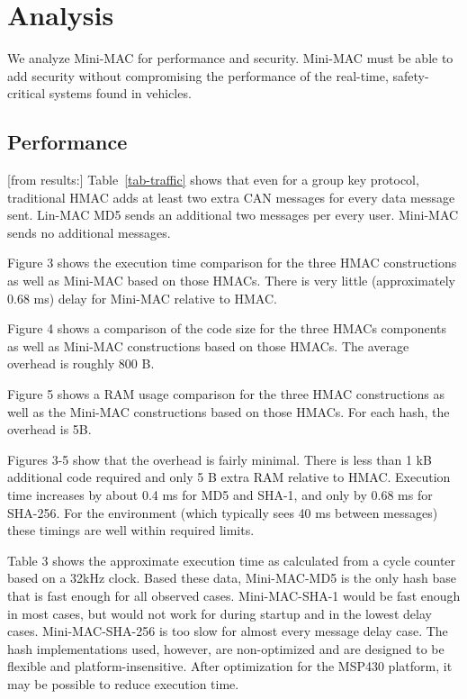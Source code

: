 \section{Analysis}
\label{analysis}



We analyze Mini-MAC for performance and security. Mini-MAC must be able to add security without compromising the performance of the real-time, safety-critical systems found in vehicles.

\subsection{Performance}
\label{performance}

[from results:]
Table~\ref{tab-traffic} shows that even for a group key protocol, 
traditional HMAC adds at least two extra CAN messages for every data message sent. 
Lin-MAC MD5 sends an additional two messages per every user. 
Mini-MAC sends no additional messages. 

Figure 3 shows the execution time comparison for the three HMAC constructions as well as Mini-MAC based on those HMACs. There is very little (approximately 0.68 ms) delay for Mini-MAC relative to HMAC.

Figure 4 shows a comparison of the code size for the three HMACs components as well as Mini-MAC constructions based on those HMACs. The average overhead is roughly 800 B.

Figure 5 shows a RAM usage comparison for the three HMAC constructions as well as the Mini-MAC constructions based on those HMACs. For each hash, the overhead is 5B.

Figures 3-5 show that the overhead is fairly minimal. There is less than 1 kB additional code required and only 5 B extra RAM relative to HMAC. Execution time increases by about 0.4 ms for MD5 and SHA-1, and only by 0.68 ms for SHA-256. For the environment (which typically sees 40 ms between messages) these timings are well within required limits.

Table 3 shows the approximate execution time as calculated from a cycle counter based on a 32kHz clock. Based these data, Mini-MAC-MD5 is the only hash base that is fast enough for all observed cases. Mini-MAC-SHA-1 would be fast enough in most cases, but would not work for during startup and in the lowest delay cases. Mini-MAC-SHA-256 is too slow for almost every message delay case. The hash implementations used, however, are non-optimized and are designed to be flexible and platform-insensitive. After optimization for the MSP430 platform, it may be possible to reduce execution time.

